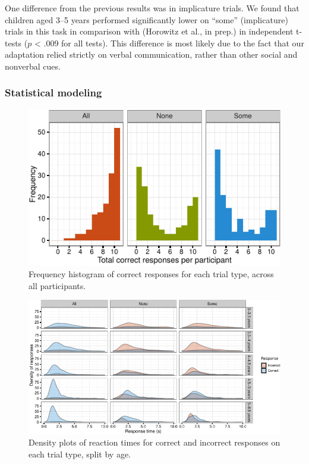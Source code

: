 \documentclass[10pt, letterpaper]{article}
\newenvironment{CodeChunk}{}{}
\begin{document}
One difference from the previous results was in implicature trials. We
found that children aged 3--5 years performed significantly lower on
``some'' (implicature) trials in this task in comparison with (Horowitz
et al., in prep.) in independent t-tests (\(p\) \textless{} .009 for all
tests). This difference is most likely due to the fact that our
adaptation relied strictly on verbal communication, rather than other
social and nonverbal cues.

\subsubsection{Statistical modeling}\label{statistical-modeling}

\begin{CodeChunk}
\begin{figure}[t]
\includegraphics{figs/diptest-1} \caption[Frequency histogram of correct responses for each trial type, across all participants]{Frequency histogram of correct responses for each trial type, across all participants.}\label{fig:diptest}
\end{figure}
\end{CodeChunk}

\begin{CodeChunk}
\begin{figure}[t]

{\centering \includegraphics{figs/dense-1} 

}

\caption[Density plots of reaction times for correct and incorrect responses on each trial type, split by age]{Density plots of reaction times for correct and incorrect responses on each trial type, split by age.}\label{fig:dense}
\end{figure}
\end{CodeChunk}
\end{document}
